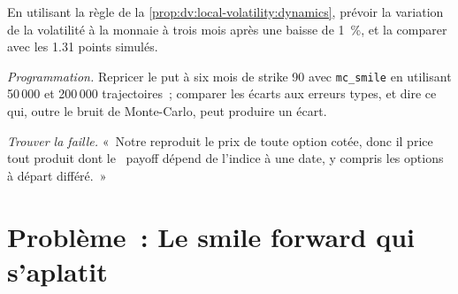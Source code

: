 \begin{exercise}[$\star\star$]\label{exo:dv:local-volatility:6}
En utilisant la règle de la \cref{prop:dv:local-volatility:dynamics}, prévoir la variation de la volatilité à la monnaie à trois mois
après une baisse de 1~\%, et la comparer avec les 1.31 points simulés.
\end{exercise}

\begin{exercise}[$\star\star\star$]\label{exo:dv:local-volatility:7}
\emph{Programmation.} Repricer le put à six mois de strike 90 avec \texttt{mc\_smile} en utilisant 50\,000 et 200\,000 trajectoires~; comparer les
écarts aux erreurs types, et dire ce qui, outre le bruit de Monte-Carlo, peut produire un écart.
\end{exercise}

\begin{exercise}[$\star\star\star$]\label{exo:dv:local-volatility:8}
\emph{Trouver la faille.} «~Notre  reproduit le prix de toute option cotée, donc il price tout produit dont le~
payoff dépend de l'indice à une date, y compris les options à départ différé.~»
\end{exercise}

\section{Problème~: Le smile forward qui s'aplatit}

